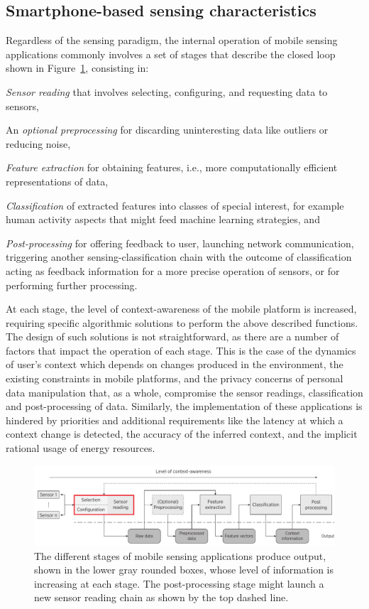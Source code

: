 \documentclass[12pt]{article}
\numberwithin{equation}{section}
\numberwithin{table}{section}
\numberwithin{figure}{section}
\begin{document}
\subsection{Smartphone-based sensing characteristics}
Regardless of the sensing paradigm, the internal operation of mobile sensing applications commonly involves a set of stages that describe the closed loop shown in Figure~\ref{fig:stages-of-power-aware-mobile-sensing}, consisting in:
\begin{listahorizontal}
  \item \emph{Sensor reading} that involves selecting, configuring, and requesting data to sensors,
  \item An \emph{optional preprocessing} for discarding uninteresting data like outliers or reducing noise,
  \item \emph{Feature extraction} for obtaining features, i.e., more computationally efficient representations of data,
  \item \emph{Classification} of extracted features into classes of special interest, for example human activity aspects that might feed machine learning strategies, and
  \item \emph{Post-processing} for offering feedback to user, launching network communication, triggering another sensing-classification chain with the outcome of classification acting as feedback information for a more precise operation of sensors, or for performing further processing.
\end{listahorizontal}
At each stage, the level of context-awareness of the mobile platform is increased, requiring specific algorithmic solutions to perform the above described functions.
The design of such solutions is not straightforward, as there are a number of factors that impact the operation of each stage.
This is the case of the dynamics of user's context which depends on changes produced in the environment, the existing constraints in mobile platforms, and the privacy concerns of personal data manipulation that, as a whole, compromise the sensor readings, classification and post-processing of data.
Similarly, the implementation of these applications is hindered by priorities and additional requirements like the latency at which a context change is detected, the accuracy of the inferred context, and the implicit rational usage of energy resources.
\begin{figure}[t]
    \centering
    \includegraphics[width=\textwidth]{msa-stages}
    \caption{The different stages of mobile sensing applications produce output, shown in the lower gray rounded boxes, whose level of information is increasing at each stage. The post-processing stage might launch a new sensor reading chain as shown by the top dashed line.}
    \label{fig:stages-of-power-aware-mobile-sensing}
\end{figure}
\end{document}
